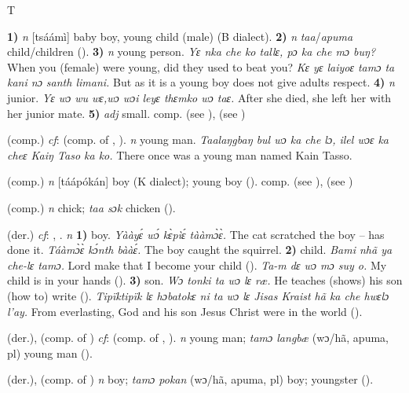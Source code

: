 \begin{letter}{T}

 \textbf{1)} \textit{n} [tsáámì] baby boy, young child (male) (B dialect). \textbf{2)} \textit{n} \textit{taa}/\textit{apuma} child/children (\citealt{Pichl1967}). \textbf{3)} \textit{n} young person. \textit{Yɛ nka che ko tallɛ, pɔ ka che mɔ buŋ?} When you (female) were young, did they used to beat you? \textit{Kɛ yɛ laiyoɛ tamɔ ta kani nɔ santh limani.} But as it is a young boy does not give adults respect. \textbf{4)} \textit{n} junior. \textit{Yɛ wɔ wu wɛ,wɔ wɔi leyɛ thɛmko wɔ taɛ.} After she died, she left her with her junior mate. \textbf{5)} \textit{adj} small. comp.  (see ),  (see ) 

 (comp.) \textit{cf}:  (comp. of , ). \textit{n} young man. \textit{Taalaŋgbaŋ bul wɔ ka che lɔ, ilel wɔɛ ka cheɛ Kaiŋ Taso ka ko.} There once was a young man named Kain Tasso.

 (comp.) \textit{n} [táápókán] boy (K dialect); young boy (\citealt{Pichl1967}). comp.  (see ),  (see )

 (comp.) \textit{n} chick; \textit{taa sɔk} chicken (\citealt{Pichl1967}). 

 (der.) \textit{cf}: , . \textit{n} \textbf{1)} boy. \textit{Yààyɛ́ wɔ́ kɛ̀pìɛ́ tààmɔ̀ɛ̀.} The cat scratched the boy – has done it. \textit{Táàmɔ̀ɛ̀ kɔ́nth bààɛ́.} The boy caught the squirrel. \textbf{2)} child. \textit{Bami nhã ya che-lɛ tamɔ.} Lord make that I become your child (\citealt{Pichl1967}). \textit{Ta-m dɛ wɔ mɔ suy o.} My child is in your hands (\citealt{Pichl1967}). \textbf{3)} son. \textit{Wɔ tonki ta wɔ lɛ ræ.} He teaches (shows) his son (how to) write (\citealt{Pichl1967}). \textit{Tipïktipïk lɛ hɔbatokɛ ni ta wɔ lɛ Jisas Kraist hã ka che hwɛlɔ l'ay.} From everlasting, God and his son Jesus Christ were in the world (\citealt{Pichl1967}). 

 (der.), (comp. of ) \textit{cf}: (comp. of , ). \textit{n} young man; \textit{tamɔ langbæ} (wɔ/hã, apuma, pl) young man (\citealt{Pichl1967}). 

 (der.), (comp. of ) \textit{n} boy; \textit{tamɔ pokan} (wɔ/hã, apuma, pl) boy; youngster (\citealt{Pichl1967}). 


\end{letter}
